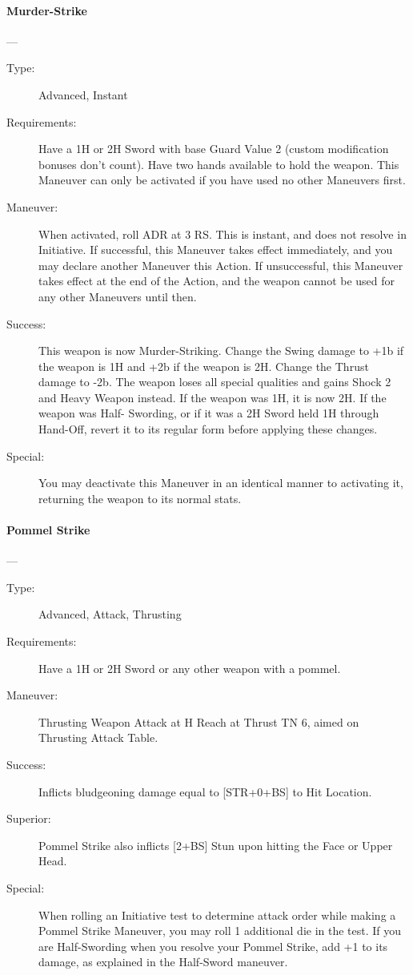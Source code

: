 \documentclass[oneside,11pt,english]{book}
\begin{document}
\paragraph{\large\label{man:Murder-Strike}Murder-Strike}---\quad{\large[2]}
\vspace{-10pt}\begin{description} 
\item [Type:] Advanced, Instant 
\item [Requirements:] Have a 1H or 2H Sword with base Guard Value 2 (custom modification bonuses don’t 
count). Have two hands available to hold the weapon. This Maneuver can only be activated if you have 
used no other Maneuvers first. 
\item [Maneuver:] When activated, roll ADR at 3 RS. This is instant, and does not resolve in Initiative. If 
successful, this Maneuver takes effect immediately, and you may declare another Maneuver this Action. 
If unsuccessful, this Maneuver takes effect at the end of the Action, and the weapon cannot be used for 
any other Maneuvers until then. 
\item [Success:] This weapon is now Murder-Striking. Change the Swing damage to +1b if the weapon is 1H and 
+2b if the weapon is 2H. Change the Thrust damage to -2b. The weapon loses all special qualities and 
gains Shock 2 and Heavy Weapon instead. If the weapon was 1H, it is now 2H. If the weapon was Half-
Swording, or if it was a 2H Sword held 1H through Hand-Off, revert it to its regular form before applying 
these changes. 
\item [Special:] You may deactivate this Maneuver in an identical manner to activating it, returning the weapon 
to its normal stats. 
\end{description}
\paragraph{\large\label{man:Pommel Strike}Pommel Strike}---\quad{\large[X]}
\vspace{-10pt}\begin{description} 
\item [Type:] Advanced, Attack, Thrusting 
\item [Requirements:] Have a 1H or 2H Sword or any other weapon with a pommel. 
\item [Maneuver:] Thrusting Weapon Attack at H Reach at Thrust TN 6, aimed on Thrusting Attack Table. 
\item [Success:] Inflicts bludgeoning damage equal to [STR+0+BS] to Hit Location. 
\item [Superior:] Pommel Strike also inflicts [2+BS] Stun upon hitting the Face or Upper Head. 
\item [Special:] When rolling an Initiative test to determine attack order while making a Pommel Strike 
Maneuver, you may roll 1 additional die in the test. If you are Half-Swording when you resolve your 
Pommel Strike, add +1 to its damage, as explained in the Half-Sword maneuver. 
\end{description}
\end{document}
